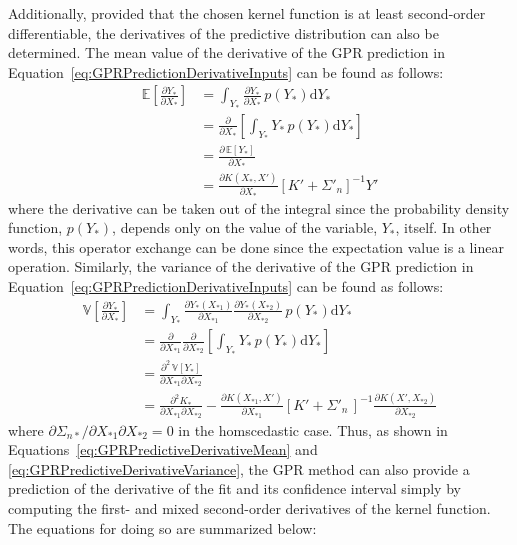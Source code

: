 \documentclass{article}
\begin{document}
Additionally, provided that the chosen kernel function is at least second-order differentiable, the derivatives of the predictive distribution can also be determined. The mean value of the derivative of the GPR prediction in Equation~\eqref{eq:GPRPredictionDerivativeInputs} can be found as follows:
\begin{equation}
\label{eq:GPRPredictiveDerivativeMean}
	\begin{aligned}
	\mathbb{E}\!\left[\frac{\partial Y_*}{\partial X_*}\right] &= \int_{Y_*} \frac{\partial Y_*}{\partial X_*} \, p\!\left(Y_*\right) \text{d}Y_* \\
	&= \frac{\partial}{\partial X_*} \left[\int_{Y_*} Y_* \, p\!\left(Y_*\right) \text{d}Y_*\right] \\
	&= \frac{\partial \, \mathbb{E}\!\left[Y_*\right]}{\partial X_*} \\
	&= \frac{\partial K\!\left(X_*,X'\right)}{\partial X_*} \left[K' + \Sigma'_n\right]^{-1} Y'
	\end{aligned}
\end{equation}
where the derivative can be taken out of the integral since the probability density function, $p\!\left(Y_*\right)$, depends only on the value of the variable, $Y_*$, itself. In other words, this operator exchange can be done since the expectation value is a linear operation. Similarly, the variance of the derivative of the GPR prediction in Equation~\eqref{eq:GPRPredictionDerivativeInputs} can be found as follows:
\begin{equation}
\label{eq:GPRPredictiveDerivativeVariance}
	\begin{aligned}
	\mathbb{V}\!\left[\frac{\partial Y_*}{\partial X_*}\right] &= \int_{Y_*} \frac{\partial Y_*\!\left(X_{*1}\right)}{\partial X_{*1}} \frac{\partial Y_*\!\left(X_{*2}\right)}{\partial X_{*2}} \, p\!\left(Y_*\right) \text{d}Y_* \\
	&= \frac{\partial}{\partial X_{*1}} \frac{\partial}{\partial X_{*2}} \left[\int_{Y_*} Y_* \, p\!\left(Y_*\right) \text{d}Y_*\right] \\
	&= \frac{\partial^2 \, \mathbb{V}\!\left[Y_*\right]}{\partial X_{*1} \partial X_{*2}} \\
	&= \frac{\partial^2 K_*}{\partial X_{*1} \partial X_{*2}} - \frac{\partial K\!\left(X_{*1},X'\right)}{\partial X_{*1}} \left[K' + \Sigma'_n\,\right]^{-1} \frac{\partial K\!\left(X',X_{*2}\right)}{\partial X_{*2}}
	\end{aligned}
\end{equation}
where $\partial \Sigma_{n*} / \partial X_{*1} \partial X_{*2} = 0$ in the homscedastic case. Thus, as shown in Equations~\eqref{eq:GPRPredictiveDerivativeMean} and \eqref{eq:GPRPredictiveDerivativeVariance}, the GPR method can also provide a prediction of the derivative of the fit and its confidence interval simply by computing the first- and mixed second-order derivatives of the kernel function. The equations for doing so are summarized below:
\end{document}

